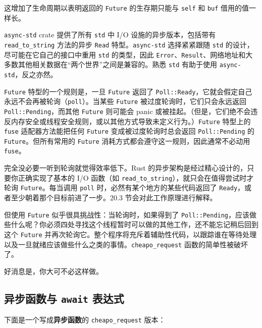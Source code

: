 这增加了生命周期以表明返回的 \texttt{Future} 的生存期只能与 \texttt{self} 和 \texttt{buf} 借用的值一样长。

\texttt{async-std} crate 提供了所有 \texttt{std} 中 I/O 设施的异步版本，包括带有 \texttt{read\_to\_string} 方法的异步 \texttt{Read} 特型。\texttt{async-std} 选择紧紧跟随 \texttt{std} 的设计，尽可能在它自己的接口中重用 \texttt{std} 的类型，因此 \texttt{Error}、\texttt{Result}、网络地址和大多数其他相关数据在“两个世界”之间是兼容的。熟悉 \texttt{std} 有助于使用 \texttt{async-std}，反之亦然。

\texttt{Future} 特型的一个规则是，一旦 \texttt{Future} 返回了 \texttt{Poll::Ready}，它就会假定自己永远不会再被轮询（\texttt{poll}）。当某些 \texttt{Future} 被过度轮询时，它们只会永远返回 \texttt{Poll::Pending}，而其他 \texttt{Future} 则可能会 panic 或被挂起。（但是，它们绝不会违反内存安全或线程安全规则，或以其他方式导致未定义行为。）\texttt{Future} 特型上的 \texttt{fuse} 适配器方法能把任何 \texttt{Future} 变成被过度轮询时总会返回 \texttt{Poll::Pending} 的 \texttt{Future}。但所有常用的 \texttt{Future} 消耗方式都会遵守这一规则，因此通常不必动用 \texttt{fuse}。

完全没必要一听到轮询就觉得效率低下。Rust 的异步架构是经过精心设计的，只要你正确实现了基本的 I/O 函数（如 \texttt{read\_to\_string}），就只会在值得尝试时才轮询 \texttt{Future}。每当调用 \texttt{poll} 时，必然有某个地方的某些代码返回了 \texttt{Ready}，或者至少朝着那个目标前进了一步。20.3 节会对此工作原理进行解释。

但使用 \texttt{Future} 似乎很具挑战性：当轮询时，如果得到了 \texttt{Poll::Pending}，应该做些什么呢？你必须四处寻找这个线程暂时可以做的其他工作，还不能忘记稍后回到这个 \texttt{Future} 并再次轮询它。整个程序将充斥着辅助性代码，以跟踪谁在等待处理以及一旦就绪应该做些什么之类的事情。\texttt{cheapo\_request} 函数的简单性被破坏了。

好消息是，你大可不必这样做。

\subsection{异步函数与 \texttt{await} 表达式}

下面是一个写成\textbf{异步函数}的 \texttt{cheapo\_request} 版本：

